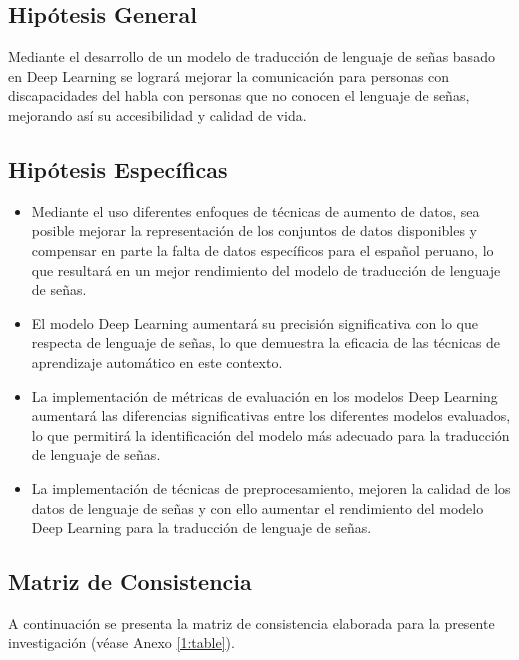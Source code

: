 \subsection{Hipótesis General}
\newcommand{\HipotesisGeneral}{
Mediante el desarrollo de un modelo de traducción de lenguaje de señas basado en Deep Learning se logrará mejorar la comunicación para personas con discapacidades del habla con personas que no conocen el lenguaje de señas, mejorando así su accesibilidad y calidad de vida.
}
\HipotesisGeneral
\subsection{Hipótesis Específicas}
\newcommand{\Hone}{
	Mediante el uso diferentes enfoques de técnicas de aumento de datos, sea posible mejorar la representación de los conjuntos de datos disponibles y compensar en parte la falta de datos específicos para el español peruano, lo que resultará en un mejor rendimiento del modelo de traducción de lenguaje de señas.
}
\newcommand{\Htwo}{
	El modelo Deep Learning aumentará su precisión significativa con lo que respecta de lenguaje de señas, lo que demuestra la eficacia de las técnicas de aprendizaje automático en este contexto.
}
\newcommand{\Hthree}{
	La implementación de métricas de evaluación en los modelos Deep Learning aumentará las diferencias significativas entre los diferentes modelos evaluados, lo que permitirá la identificación del modelo más adecuado para la traducción de lenguaje de señas.
}
\newcommand{\Hfour}{
	La implementación de técnicas de preprocesamiento, mejoren la calidad de los datos de lenguaje de señas y con ello aumentar el rendimiento del modelo Deep Learning para la traducción de lenguaje de señas.
}

\begin{itemize}
	\item \Hone
	\item \Htwo
	\item \Hthree
	\item \Hfour
\end{itemize}

\subsection{Matriz de Consistencia}
A continuación se presenta la matriz de consistencia elaborada para la presente investigación (véase Anexo \ref{1:table}).

